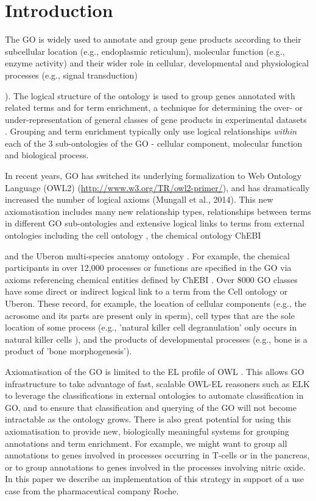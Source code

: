 \documentclass[runningheads,a4paper]{llncs}
\begin{document}
\section{Introduction}


The \acf{GO} is widely used to annotate and group gene products according to their subcellular location (e.g., endoplasmic reticulum), molecular function (e.g., enzyme activity) and their wider role in cellular, developmental and physiological processes (e.g., signal transduction) {\cite{GO2015}). The logical structure of the ontology is used to group genes annotated with related terms and for term enrichment, a technique for determining the over- or under-representation of general classes of gene products in experimental datasets \cite{Shah2012}. Grouping and term enrichment typically only use logical relationships \textit{within} each of the 3 sub-ontologies of the \ac{GO} - cellular component, molecular function and biological process.

In recent years, \ac{GO} has switched its underlying formalization to Web Ontology Language (OWL2) (\url{http://www.w3.org/TR/owl2-primer/}), and has dramatically increased the number of logical axioms (Mungall et al., 2014). This new axiomatisation includes many new relationship types, relationships between terms in different \ac{GO} sub-ontologies and extensive logical links to terms from external ontologies including the cell ontology \cite{Meehan2011}, the chemical ontology ChEBI {\cite{Hastings2013} and the Uberon multi-species anatomy ontology \cite{Haendel2014}.  For example, the chemical participants in over 12,000 processes or functions are specified in the \ac{GO} via axioms referencing chemical entities defined by ChEBI \cite{Hill2013}. Over 8000 \ac{GO} classes have some direct or indirect logical link to a term from the Cell ontology or Uberon. These record, for example, the location of cellular components (e.g., the acrosome and its parts are present only in sperm), cell types that are the sole location of some process (e.g., 'natural killer cell degranulation' only occurs in natural killer cells ), and the products of developmental processes (e.g., bone is a product of 'bone morphogenesis').

Axiomatisation of the \ac{GO} is limited to the EL profile of OWL \cite{Mungall2014}. This allows \ac{GO} infrastructure to take advantage of fast, scalable OWL-EL reasoners such as ELK \cite{kazakov2012} to leverage the classifications in external ontologies to automate classification in \ac{GO}, and to ensure that classification and querying of the \ac{GO} will not become intractable as the ontology grows.  There is also great potential for using this axiomatisation to provide new, biologically meaningful systems for grouping annotations and term enrichment.  For example, we might want to group all annotations to genes involved in processes occurring in T-cells or in the pancreas, or to group annotations to genes involved in the processes involving nitric oxide.  In this paper we describe an implementation of this strategy in support of a use case from the pharmaceutical company Roche.

}}
\end{document}
